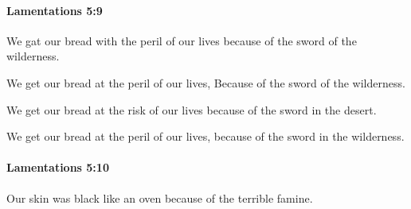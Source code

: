		\paragraph{Lamentations 5:9} %
			\label{LAMENTATIONS-5-9}

			We gat our bread with the peril of our lives because of the sword of the wilderness.

			\begin{versebox}
					\item[BHS] 
					\item[LXX] 
					\item[ASV] We get our bread at the peril of our lives, Because of the sword of the wilderness.
					\item[NIV] We get our bread at the risk of our lives because of the sword in the desert.
					\item[NRSV] We get our bread at the peril of our lives, because of the sword in the wilderness.
			\end{versebox}

		\paragraph{Lamentations 5:10} %
			\label{LAMENTATIONS-5-10}

			Our skin was black like an oven because of the terrible famine.

